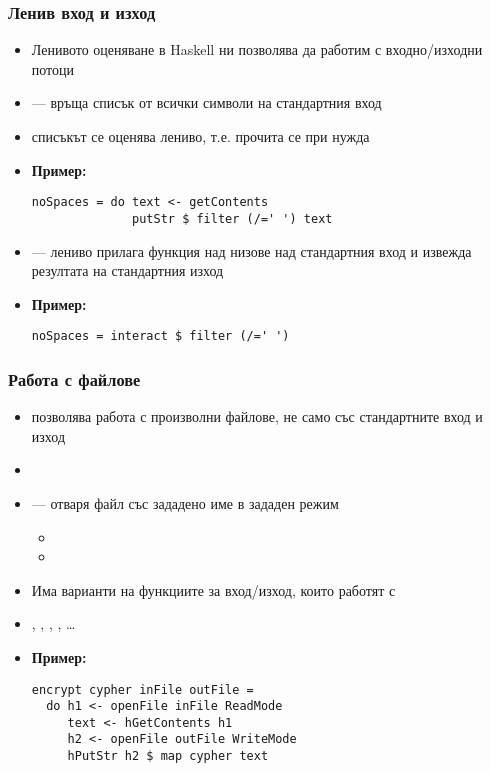\documentclass[alsotrans,beameroptions={aspectratio=169}]{beamerswitch}
\begin{document}
\begin{frame}[fragile]
  \frametitle{Ленив вход и изход}

  \begin{itemize}[<+->]
  \item Ленивото оценяване в Haskell ни позволява да работим с входно/изходни потоци
  \item {} --- връща списък от \alert{всички} символи на стандартния вход
  \item списъкът се оценява лениво, т.е. прочита се при нужда
  \item \textbf{Пример:}
\begin{lstlisting}
noSpaces = do text <- getContents
              putStr $ filter (/=' ') text
\end{lstlisting}
  \item {} --- лениво прилага функция над низове над стандартния вход и извежда резултата на стандартния изход
  \item \textbf{Пример:}
\begin{lstlisting}
noSpaces = interact $ filter (/=' ')
\end{lstlisting}
  \end{itemize}
\end{frame}

\begin{frame}[fragile]
  \frametitle{Работа с файлове}

  \begin{itemize}[<+->]
  \item {} позволява работа с произволни файлове, не само със стандартните вход и изход
  \item {}
  \item {} --- отваря файл със зададено име в зададен режим
    \begin{itemize}
      \footnotesize
    \item {}
    \item {}
    \end{itemize}
  \item Има варианти на функциите за вход/изход, които работят с 
  \item {}, , , , \ldots
  \item \textbf{Пример:}
    \vspace{-1ex}
\begin{lstlisting}
encrypt cypher inFile outFile =
  do h1 <- openFile inFile ReadMode
     text <- hGetContents h1
     h2 <- openFile outFile WriteMode
     hPutStr h2 $ map cypher text
\end{lstlisting}
  \end{itemize}
\end{frame}
\end{document}
